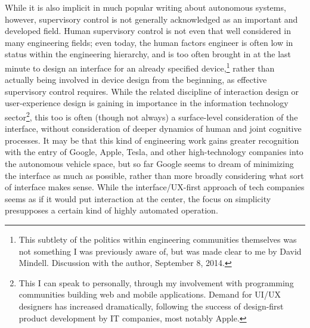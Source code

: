 
 While it is also
implicit in much popular writing about autonomous systems, however,
supervisory control is not generally acknowledged as an important and
developed field. Human supervisory control is not even that well
considered in many engineering fields; even today, the human factors
engineer is often low in status within the engineering hierarchy, and
is too often brought in at the last minute to design an interface for
an already specified device,\footnote{This subtlety of the politics
  within engineering communities themselves was not something I was
  previously aware of, but was made clear to me by David Mindell.
  Discussion with the author, September 8, 2014.} rather than actually being involved in
device design from the beginning, as effective supervisory control
requires. While the related discipline of interaction design or
user-experience design is gaining in importance in the information
technology sector\footnote{This I can speak to personally, through my
  involvement with programming communities building web and mobile
  applications. Demand for UI/UX designers has increased dramatically,
following the success of design-first product development by IT
companies, most notably Apple.}, this too is often (though not always) a surface-level
consideration of the interface, without consideration of deeper
dynamics of human and joint cognitive processes. It may be
that this kind of engineering work gains greater recognition with the
entry of Google, Apple, Tesla, and other high-technology companies
into the autonomous vehicle space, but so far Google seems to dream
of minimizing the interface as much as possible, rather than more
broadly considering what sort of interface makes sense.\cite{???}
While the interface/UX-first approach of tech companies seems as if it
would put interaction at the center, the focus on simplicity
presupposes a certain kind of highly automated operation.

